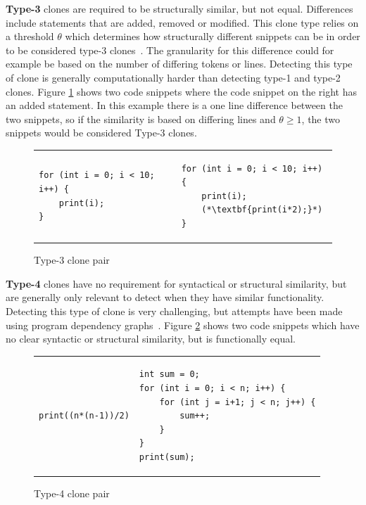 \textbf{Type-3} clones are required to be structurally similar, but not equal. Differences
include statements that are added, removed or modified. This clone type relies on a
threshold $\theta$ which determines how structurally different snippets can be in order to
be considered type-3 clones~\cite[6]{Inoue_introduction_to_cc}. The granularity for this
difference could for example be based on the number of differing tokens or lines.
Detecting this type of clone is generally computationally harder than detecting type-1 and
type-2 clones. Figure \ref{fig:type3clone} shows two code snippets where the code snippet
on the right has an added statement. In this example there is a one line difference
between the two snippets, so if the similarity is based on differing lines and $\theta
\geq 1$, the two snippets would be considered Type-3 clones.

\begin{figure}[t]
	\begin{center}
        \begin{tabular}{p{5cm} | p{5cm}}
			\begin{lstlisting}
for (int i = 0; i < 10; i++) {
    print(i);
}
\end{lstlisting} &
			\begin{lstlisting}
for (int i = 0; i < 10; i++) {
    print(i);
    (*\textbf{print(i*2);}*)
}
\end{lstlisting}
		\end{tabular}
	\end{center}
    \caption{Type-3 clone pair}
    \label{fig:type3clone}
\end{figure}



\textbf{Type-4} clones have no requirement for syntactical or structural similarity, but
are generally only relevant to detect when they have similar functionality. Detecting this
type of clone is very challenging, but attempts have been made using program dependency
graphs~\cite{SeedType4Detection}. Figure \ref{fig:type4clone} shows two code snippets
which have no clear syntactic or structural similarity, but is functionally equal.

\begin{figure}[t]
	\begin{center}
        \begin{tabular}{p{5cm} | p{5cm}}
			\begin{lstlisting}
print((n*(n-1))/2)
\end{lstlisting} &
			\begin{lstlisting}
int sum = 0;
for (int i = 0; i < n; i++) {
    for (int j = i+1; j < n; j++) {
        sum++;
    }
}
print(sum);
\end{lstlisting}
		\end{tabular}
	\end{center}
    \caption{Type-4 clone pair}
    \label{fig:type4clone}
\end{figure}



